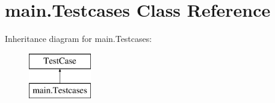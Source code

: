 \hypertarget{classmain_1_1_testcases}{}\section{main.\+Testcases Class Reference}
\label{classmain_1_1_testcases}
Inheritance diagram for main.\+Testcases\+:\begin{figure}[H]
\begin{center}
\leavevmode
\includegraphics[height=2.000000cm]{classmain_1_1_testcases}
\end{center}
\end{figure}
